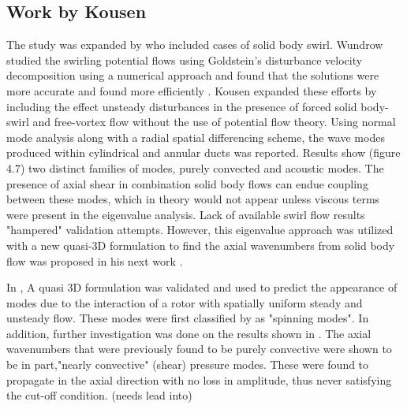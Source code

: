 \documentclass[conf]{new-aiaa}
\begin{document}
\subsection{Work by Kousen}
The study was expanded by \cite{Kerrebrock1977,Yousefian1975,Yurkovich498} who included cases of solid body swirl. Wundrow studied the swirling potential flows using Goldstein's disturbance velocity decomposition \cite{ME1978} using a numerical approach and found that the solutions were more accurate and found more efficiently \cite{Wundrow2019}. Kousen expanded these efforts by including \cite{Kousen1999} the effect unsteady disturbances in the presence of forced solid body-swirl and free-vortex flow without the use of potential flow theory. Using normal mode analysis along with a radial spatial differencing scheme, the wave modes produced within cylindrical and annular ducts was reported. Results show (figure 4.7) two distinct families of modes, purely convected and acoustic modes. The presence of axial shear in combination solid body flows can endue coupling between these modes, which in theory would not appear unless viscous terms were present in the eigenvalue analysis. Lack of available swirl flow results "hampered" validation attempts. However, this eigenvalue approach was utilized with a new quasi-3D formulation to find the axial wavenumbers from solid body flow was proposed in his next work . 

In \cite{Kousen1996}, A quasi 3D formulation was validated and used to predict the appearance of modes due to the interaction of a rotor with spatially uniform steady and unsteady flow. These modes were first classified by \cite{Tyler1962} as "spinning modes". In addition, further investigation was done on the results shown in \cite{Kousen1999}. The axial wavenumbers that were previously found to be purely convective were shown to be in part,"nearly convective" (shear) pressure modes. These were found to propagate in the axial direction with no loss in amplitude, thus never satisfying the cut-off condition. (needs lead into)
\end{document}
